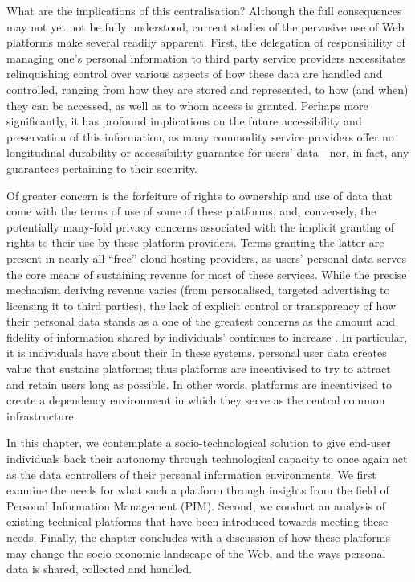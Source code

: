 \documentclass[runningheads,a4paper]{llncs}
\begin{document}
What are the implications of this centralisation?  Although the full consequences may not yet not be fully understood, current studies of the pervasive use of Web platforms make several readily apparent.  First, the delegation of responsibility of managing one's personal information to third party service providers necessitates relinquishing control over various aspects of how these data are handled and controlled, ranging from how they are stored and represented, to how (and when) they can be accessed, as well as to whom access is granted.  Perhaps more significantly, it has profound implications on the future accessibility and preservation of this information, as many commodity service providers offer no longitudinal durability or accessibility guarantee for users' data---nor, in fact, any guarantees pertaining to their security.

Of greater concern is the forfeiture of rights to ownership and use of data that come with the terms of use of some of these platforms, and, conversely, the potentially many-fold privacy concerns associated with the implicit granting of rights to their use by these platform providers. Terms granting the latter are present in nearly all ``free'' cloud hosting providers, as users' personal data serves the core means of sustaining revenue for most of these services.  While the precise mechanism deriving revenue varies (from personalised, targeted advertising to licensing it to third parties), the lack of explicit control or transparency of how their personal data stands as a one of the greatest concerns as the amount and fidelity of information shared by individuals' continues to increase \cite{}.  In particular, it is individuals have about their  In these systems, personal user data creates value that sustains platforms; thus platforms are incentivised to try to attract and retain users long as possible.  In other words, platforms are incentivised to create a dependency environment in which they serve as the central common infrastructure.

In this chapter, we contemplate a socio-technological solution to give end-user individuals back their autonomy through technological capacity to once again act as the data controllers of their personal information environments.  We first examine the needs for what such a platform through insights from the field of Personal Information Management (PIM).  Second, we conduct an analysis of existing technical platforms  that have been introduced towards meeting these needs.  Finally, the chapter concludes with a discussion of how these platforms may change the socio-economic landscape of the Web, and the ways personal data is shared, collected and handled.
\end{document}
